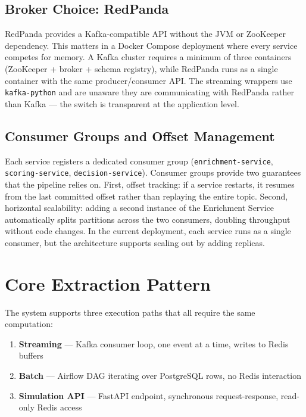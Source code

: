 \subsection{Broker Choice: RedPanda}

RedPanda provides a Kafka-compatible API without the JVM or ZooKeeper
dependency. This matters in a Docker Compose deployment where every service
competes for memory. A Kafka cluster requires a minimum of three containers
(ZooKeeper + broker + schema registry), while RedPanda runs as a single
container with the same producer/consumer API. The streaming wrappers use
\texttt{kafka-python} and are unaware they are communicating with RedPanda
rather than Kafka --- the switch is transparent at the application level.

\subsection{Consumer Groups and Offset Management}

Each service registers a dedicated consumer group
(\texttt{enrichment-service}, \texttt{scoring-service},
\texttt{decision-service}). Consumer groups provide two guarantees that the
pipeline relies on. First, offset tracking: if a service restarts, it resumes
from the last committed offset rather than replaying the entire topic. Second,
horizontal scalability: adding a second instance of the Enrichment Service
automatically splits partitions across the two consumers, doubling throughput
without code changes. In the current deployment, each service runs as a single
consumer, but the architecture supports scaling out by adding replicas.

\section{Core Extraction Pattern}

The system supports three execution paths that all require the same computation:

\begin{enumerate}
    \item \textbf{Streaming} --- Kafka consumer loop, one event at a time,
          writes to Redis buffers
    \item \textbf{Batch} --- Airflow DAG iterating over PostgreSQL rows,
          no Redis interaction
    \item \textbf{Simulation API} --- FastAPI endpoint, synchronous
          request-response, read-only Redis access
\end{enumerate}

